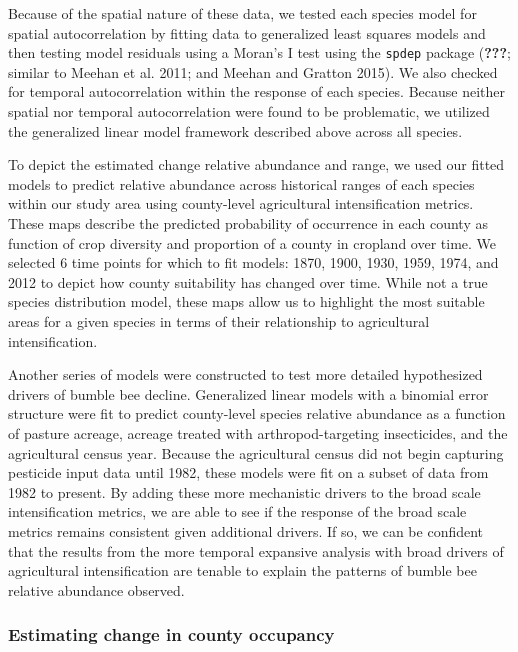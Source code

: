 \documentclass[11pt,]{article}
\begin{document}
Because of the spatial nature of these data, we tested each species
model for spatial autocorrelation by fitting data to generalized least
squares models and then testing model residuals using a Moran's I test
using the \texttt{spdep} package ({\textbf{???}}; similar to Meehan et
al. 2011; and Meehan and Gratton 2015). We also checked for temporal
autocorrelation within the response of each species. Because neither
spatial nor temporal autocorrelation were found to be problematic, we
utilized the generalized linear model framework described above across
all species.

To depict the estimated change relative abundance and range, we used our
fitted models to predict relative abundance across historical ranges of
each species within our study area using county-level agricultural
intensification metrics. These maps describe the predicted probability
of occurrence in each county as function of crop diversity and
proportion of a county in cropland over time. We selected 6 time points
for which to fit models: 1870, 1900, 1930, 1959, 1974, and 2012 to
depict how county suitability has changed over time. While not a true
species distribution model, these maps allow us to highlight the most
suitable areas for a given species in terms of their relationship to
agricultural intensification.

Another series of models were constructed to test more detailed
hypothesized drivers of bumble bee decline. Generalized linear models
with a binomial error structure were fit to predict county-level species
relative abundance as a function of pasture acreage, acreage treated
with arthropod-targeting insecticides, and the agricultural census year.
Because the agricultural census did not begin capturing pesticide input
data until 1982, these models were fit on a subset of data from 1982 to
present. By adding these more mechanistic drivers to the broad scale
intensification metrics, we are able to see if the response of the broad
scale metrics remains consistent given additional drivers. If so, we can
be confident that the results from the more temporal expansive analysis
with broad drivers of agricultural intensification are tenable to
explain the patterns of bumble bee relative abundance observed.

\hypertarget{estimating-change-in-county-occupancy}{%
\subsubsection{Estimating change in county
occupancy}\label{estimating-change-in-county-occupancy}}
\end{document}
